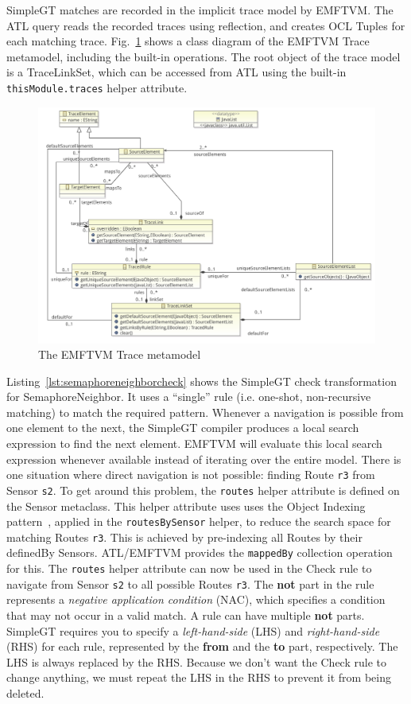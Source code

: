 \documentclass[submission,copyright,creativecommons]{eptcs}
\begin{document}
SimpleGT matches are recorded in the implicit trace model by EMFTVM. The ATL query reads the recorded traces using reflection, and creates OCL Tuples for each matching trace. Fig.~\ref{fig:emftvm-trace} shows a class diagram of the EMFTVM Trace metamodel, including the built-in operations. The root object of the trace model is a TraceLinkSet, which can be accessed from ATL using the built-in \texttt{thisModule.traces} helper attribute.

\begin{figure}[ht]
\centerline{
\includegraphics[width=15cm]{figures/trace}}
\caption{The EMFTVM Trace metamodel}
\label{fig:emftvm-trace}
\end{figure}

Listing~\ref{lst:semaphoreneighborcheck} shows the SimpleGT check transformation for SemaphoreNeighbor. It uses a ``single'' rule (i.e. one-shot, non-recursive matching) to match the required pattern. Whenever a navigation is possible from one element to the next, the SimpleGT compiler produces a local search expression to find the next element. EMFTVM will evaluate this local search expression whenever available instead of iterating over the entire model. There is one situation where direct navigation is not possible: finding Route \texttt{r3} from Sensor \texttt{s2}. To get around this problem, the \texttt{routes} helper attribute is defined on the Sensor metaclass. This helper attribute uses uses the Object Indexing pattern~\cite{conf/icsea/Lano2011}, applied in the \texttt{routesBySensor} helper, to reduce the search space for matching Routes \texttt{r3}. This is achieved by pre-indexing all Routes by their definedBy Sensors. ATL/EMFTVM provides the \texttt{mappedBy} collection operation for this. The \texttt{routes} helper attribute can now be used in the Check rule to navigate from Sensor \texttt{s2} to all possible Routes \texttt{r3}. The \textbf{not} part in the rule represents a \emph{negative application condition} (NAC), which specifies a condition that may not occur in a valid match. A rule can have multiple \textbf{not} parts. SimpleGT requires you to specify a \emph{left-hand-side} (LHS) and \emph{right-hand-side} (RHS) for each rule, represented by the \textbf{from} and the \textbf{to} part, respectively. The LHS is always replaced by the RHS. Because we don't want the Check rule to change anything, we must repeat the LHS in the RHS to prevent it from being deleted.
\end{document}
